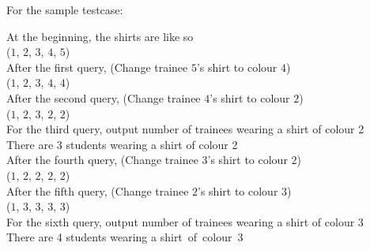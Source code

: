 For the sample testcase:

At the beginning, the shirts are like so\\
($1$, $2$, $3$, $4$, $5$)\\
After the first query, (Change trainee $5$'s shirt to colour $4$)\\
($1$, $2$, $3$, $4$, $4$)\\
After the second query, (Change trainee $4$'s shirt to colour $2$)\\
($1$, $2$, $3$, $2$, $2$)\\
For the third query, output number of trainees wearing a shirt of colour 2\\
There are 3 students wearing a shirt of colour 2\\
After the fourth query, (Change trainee $3$'s shirt to colour $2$)\\
($1$, $2$, $2$, $2$, $2$)\\
After the fifth query, (Change trainee $2$'s shirt to colour $3$)\\
($1$, $3$, $3$, $3$, $3$)\\
For the sixth query, output number of trainees wearing a shirt of colour 3\\
There are 4 students wearing a shirt of colour 3\\